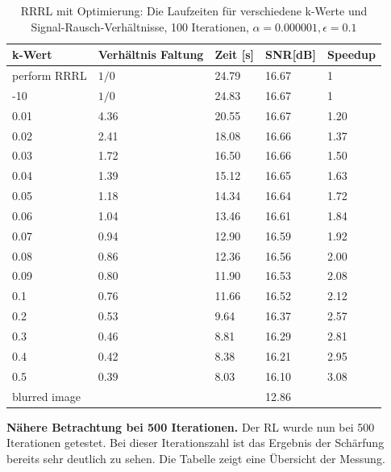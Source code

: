 \documentclass[a4paper,12pt]{article}
\begin{document}
\begin{table}[h]
\begin{center}
\begin{tabular}{ | l | l | l | l | l |}
\hline
k-Wert 			&	Verhältnis Faltung 	& Zeit [s] & SNR[dB] & Speedup \\ \hline
perform RRRL	& 		$1/0$			& 	24.79 & 16.67    & 	1	\\ \hline
-10				& 		$1/0$			& 	24.83 & 16.67    & 	1	\\ \hline
0.01			& 		4.36			&	20.55 & 16.67    &  1.20\\
0.02			& 		2.41			&	18.08 & 16.66    & 	1.37\\
0.03			& 		1.72			&	16.50 & 16.66    & 	1.50\\
0.04			&		1.39			&	15.12 & 16.65    & 	1.63\\
0.05			& 		1.18			&	14.34 & 16.64    & 	1.72\\
0.06			& 		1.04			&	13.46 & 16.61    & 	1.84\\ 
0.07			& 		0.94			&	12.90 & 16.59    & 	1.92\\
0.08			& 		0.86			&	12.36 & 16.56    & 	2.00\\
0.09			& 		0.80			&	11.90 & 16.53    & 	2.08\\
0.1				& 		0.76			&	11.66 & 16.52    & 	2.12\\
0.2				&		0.53			&	9.64  & 16.37    & 	2.57\\
0.3				&		0.46			&	8.81  & 16.29    & 	2.81\\
0.4				& 		0.42			&   8.38  & 16.21    & 	2.95\\
0.5				& 		0.39			&	8.03  & 16.10    & 	3.08\\ \hline
blurred image	&		 				& 		  & 12.86 	 & \\
\hline
\end{tabular}
\caption{RRRL mit Optimierung: Die Laufzeiten für verschiedene k-Werte
und Signal-Rausch-Verhältnisse, 100 Iterationen, $\alpha = 0.000001, \epsilon = 0.1$}
\label{tab:konv_time_SNR_RRRL}
\end{center}
\end{table}


\textbf{Nähere Betrachtung bei 500 Iterationen.}
Der RL wurde nun bei 500 Iterationen getestet. Bei dieser Iterationszahl ist das
Ergebnis der Schärfung bereits sehr deutlich zu sehen. Die Tabelle zeigt eine
Übersicht der Messung.
\end{document}
